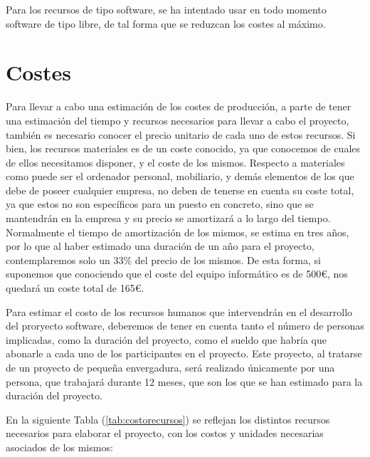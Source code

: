 Para los recursos de tipo software, se ha intentado usar en todo momento
software de tipo libre, de tal forma que se reduzcan los costes al máximo.


\section{Costes}

Para llevar a cabo una estimación de los costes de producción, a parte de tener
una estimación del tiempo y recursos necesarios para llevar a cabo el proyecto,
también es necesario conocer el precio unitario de cada uno de estos recursos.
Si bien, los recursos materiales es de un coste conocido, ya que conocemos de
cuales de ellos necesitamos disponer, y el coste de los mismos. Respecto a
materiales como puede ser el ordenador personal, mobiliario, y demás elementos
de los que debe de poseer cualquier empresa, no deben de tenerse en cuenta su
coste total, ya que estos no son específicos para un puesto en concreto, sino
que se mantendrán en la empresa y su precio se amortizará a lo largo del tiempo.
Normalmente el tiempo de amortización de los mismos, se estima en tres años, por
lo que al haber estimado una duración de un año para el proyecto, contemplaremos
solo un 33\% del precio de los mismos. De esta forma, si suponemos que
conociendo que el coste del equipo informático es de 500\euro, nos quedará un
coste total de 165\euro.

Para estimar el costo de los recursos humanos que intervendrán en el desarrollo
del proryecto software, deberemos de tener en cuenta tanto el número de personas
implicadas, como la duración del proyecto, como el sueldo que habría que
abonarle a cada uno de los participantes en el proyecto. Este proyecto, al
tratarse de un proyecto de pequeña envergadura, será realizado únicamente por
una persona, que trabajará durante 12 meses, que son los que se han estimado
para la duración del proyecto.

En la siguiente Tabla (\ref{tab:costorecursos}) se reflejan los distintos
recursos necesarios para elaborar el proyecto, con los costos y unidades
necesarias asociados de los mismos:

